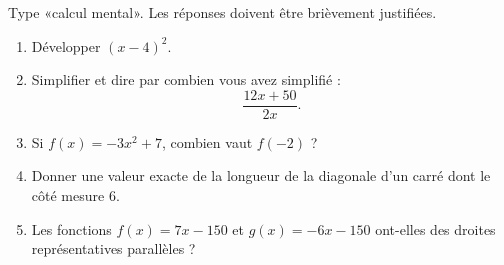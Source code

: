 
\begin{exercice}[\ldots/5]\label{exosmath-0598}

    Type «calcul mental». Les réponses doivent être brièvement justifiées.
    \begin{enumerate}
        \item
            Développer \( (x-4)^2\).
        \item
            Simplifier et dire par combien vous avez simplifié :
            \begin{equation*}
                \frac{ 12x+50 }{ 2x }.
            \end{equation*}
        \item
            Si \( f(x)=-3x^2+7\), combien vaut \( f(-2)\) ?
        \item
            Donner une valeur exacte de la longueur de la diagonale d'un carré dont le côté mesure \unit{6}{\kilo\meter}.
        \item
            Les fonctions \( f(x)=7x-150\) et \( g(x)=-6x-150\) ont-elles des droites représentatives parallèles ?
    \end{enumerate}

\end{exercice}
